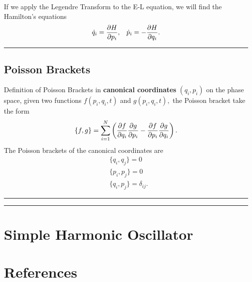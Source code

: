 \documentclass[12pt,english]{article}
\numberwithin{equation}{subsection}
\begin{document}
If we apply the Legendre Transform to the E-L equation, we will find the Hamilton's equations
\begin{align}
    \dot{q}_i = \pdv{H}{p_i}, && \dot{p}_i = -\pdv{H}{q_i}.
\end{align}
\par\noindent\rule{\textwidth}{0.4pt}
\subsection{Poisson Brackets}
Definition of Poisson Brackets in \textbf{canonical coordinates} $(q_i, p_i)$ on the phase space, given two functions $f(p_i, q_i, t)$ and $g(p_i, q_i, t),$ the Poisson bracket take the form \cite{noauthor_poissonbracket_2021}
\begin{equation}
    \{f,g\} = \sum_{i = 1}^{N} \left(\pdv{f}{q_i}\pdv{g}{p_i}-\pdv{f}{p_i}\pdv{g}{q_i}\right).
\end{equation}
The Poisson brackets of the canonical coordinates are 
\begin{align*}
    &\{q_i,q_j\}=0\\
    &\{p_i,p_j\}=0\\
    &\{q_i,p_j\}=\delta_{ij}.
\end{align*}


\par\noindent\rule{\textwidth}{0.4pt}
\par\noindent\rule{\textwidth}{0.4pt}
\section{Simple Harmonic Oscillator}




\newpage
\section*{References}
\printbibliography[heading = none]
\end{document}
